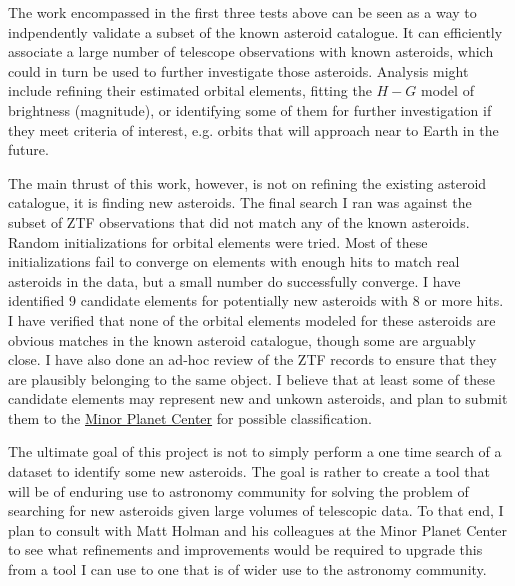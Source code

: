 The work encompassed in the first three tests above can be seen as a way to indpendently validate a subset of the known asteroid catalogue.
It can efficiently associate a large number of telescope observations with known asteroids,
which could in turn be used to further investigate those asteroids.
Analysis might include refining their estimated orbital elements, 
fitting the $H-G$ model of brightness (magnitude), or identifying some of them for further investigation if they meet criteria of interest,
e.g. orbits that will approach near to Earth in the future.

The main thrust of this work, however, is not on refining the existing asteroid catalogue, it is finding new asteroids.
The final search I ran was against the subset of ZTF observations that did not match any of the known asteroids.
Random initializations for orbital elements were tried.
Most of these initializations fail to converge on elements with enough hits to match real asteroids in the data,
but a small number do successfully converge.
I have identified 9 candidate elements for potentially new asteroids with 8 or more hits.
I have verified that none of the orbital elements modeled for these asteroids 
are obvious matches in the known asteroid catalogue, though some are arguably close.
I have also done an ad-hoc review of the ZTF records to ensure that they are plausibly belonging to the same object.
I believe that at least some of these candidate elements may represent new and unkown asteroids, and plan to submit them to the 
\href{https://www.minorplanetcenter.net/iau/mpc.html}{Minor Planet Center} for possible classification.

The ultimate goal of this project is not to simply perform a one time search of a dataset to identify some new asteroids.
The goal is rather to create a tool that will be of enduring use to astronomy community for solving the problem of 
searching for new asteroids given large volumes of telescopic data.
To that end, I plan to consult with Matt Holman and his colleagues at the Minor Planet Center to see what refinements and improvements
would be required to upgrade this from a tool I can use to one that is of wider use to the astronomy community.

